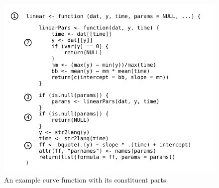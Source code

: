 \documentclass{article}
\begin{document}
\begin{figure}[H]
\centering
\includegraphics{img/fun_layout.pdf}
\caption{An example curve function with its constituent parts}
\label{fig:fun_layout}
\end{figure}
\end{document}
